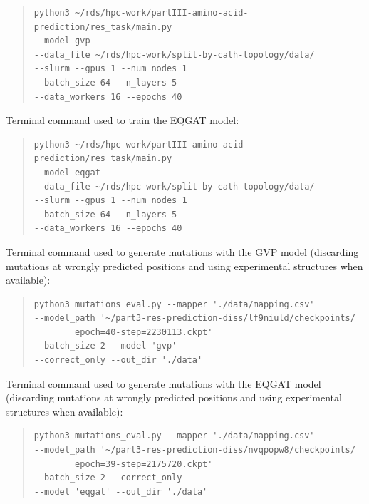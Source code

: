 \documentclass[12pt,a4paper]{report}
\begin{document}
\begin{quote}
\begin{verbatim}
python3 ~/rds/hpc-work/partIII-amino-acid-prediction/res_task/main.py
--model gvp 
--data_file ~/rds/hpc-work/split-by-cath-topology/data/ 
--slurm --gpus 1 --num_nodes 1  
--batch_size 64 --n_layers 5 
--data_workers 16 --epochs 40 
\end{verbatim}
\end{quote}
Terminal command used to train the EQGAT model:
\begin{quote}
\begin{verbatim}
python3 ~/rds/hpc-work/partIII-amino-acid-prediction/res_task/main.py 
--model eqgat 
--data_file ~/rds/hpc-work/split-by-cath-topology/data/ 
--slurm --gpus 1 --num_nodes 1  
--batch_size 64 --n_layers 5 
--data_workers 16 --epochs 40 
\end{verbatim}
\end{quote}
Terminal command used to generate mutations with the GVP model (discarding mutations at wrongly predicted positions and using experimental structures when available):
\begin{quote}
\begin{verbatim}
python3 mutations_eval.py --mapper './data/mapping.csv' 
--model_path '~/part3-res-prediction-diss/lf9niuld/checkpoints/
        epoch=40-step=2230113.ckpt' 
--batch_size 2 --model 'gvp' 
--correct_only --out_dir './data'
\end{verbatim}
\end{quote}
Terminal command used to generate mutations with the EQGAT model (discarding mutations at wrongly predicted positions and using experimental structures when available):
\begin{quote}
\begin{verbatim}
python3 mutations_eval.py --mapper './data/mapping.csv' 
--model_path '~/part3-res-prediction-diss/nvqpopw8/checkpoints/
        epoch=39-step=2175720.ckpt'
--batch_size 2 --correct_only 
--model 'eqgat' --out_dir './data'
\end{verbatim}
\end{quote}
\end{document}
